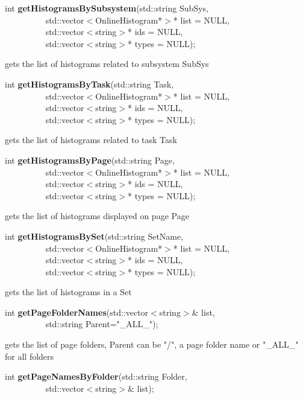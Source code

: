 \item    int {\bf getHistogramsBySubsystem}(std::string SubSys,\\\mbox{}~~~~~~~~~
			       std::vector$<$OnlineHistogram*$>$* list = NULL,\\\mbox{}~~~~~~~~~
			       std::vector$<$string$>$* ids = NULL,\\\mbox{}~~~~~~~~~
			       std::vector$<$string$>$* types = NULL);

 gets the list of histograms related to subsystem SubSys


\item    int {\bf getHistogramsByTask}(std::string Task,\\\mbox{}~~~~~~~~~
			  std::vector$<$OnlineHistogram*$>$* list = NULL,\\\mbox{}~~~~~~~~~
			  std::vector$<$string$>$* ids = NULL,\\\mbox{}~~~~~~~~~
			  std::vector$<$string$>$* types = NULL);

 gets the list of histograms related to task Task


\item    int {\bf getHistogramsByPage}(std::string Page,\\\mbox{}~~~~~~~~~
			  std::vector$<$OnlineHistogram*$>$* list = NULL,\\\mbox{}~~~~~~~~~
			  std::vector$<$string$>$* ids = NULL,\\\mbox{}~~~~~~~~~
			  std::vector$<$string$>$* types = NULL);

 gets the list of histograms displayed on page Page


\item    int {\bf getHistogramsBySet}(std::string SetName,\\\mbox{}~~~~~~~~~
			 std::vector$<$OnlineHistogram*$>$* list = NULL,\\\mbox{}~~~~~~~~~
			 std::vector$<$string$>$* ids = NULL,\\\mbox{}~~~~~~~~~
			 std::vector$<$string$>$* types = NULL);

 gets the list of histograms in a Set


\item    int {\bf getPageFolderNames}(std::vector$<$string$>$\& list,\\\mbox{}~~~~~~~~~ std::string Parent="\_ALL\_");


 gets the list of page folders, Parent can be "/", a page folder name or "\_ALL\_" for all folders  


\item    int {\bf getPageNamesByFolder}(std::string Folder,\\\mbox{}~~~~~~~~~
			   std::vector$<$string$>$\& list);

